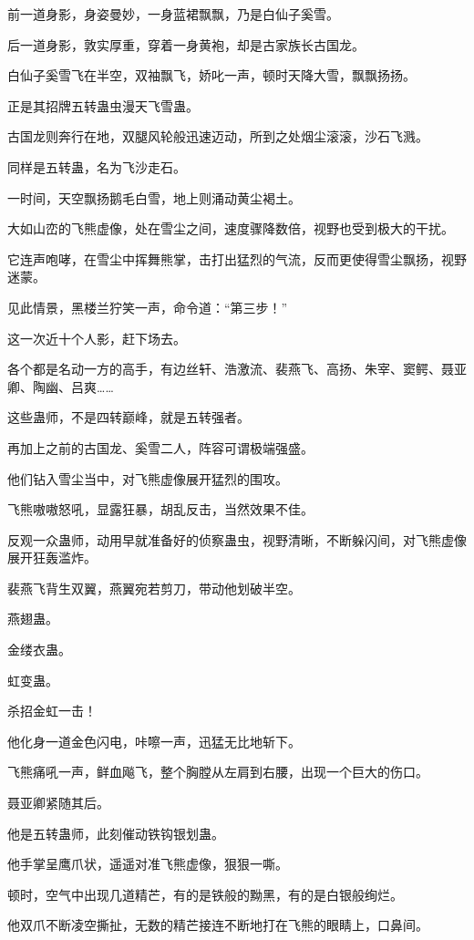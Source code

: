 \begin{this_body}
前一道身影，身姿曼妙，一身蓝裙飘飘，乃是白仙子奚雪。

后一道身影，敦实厚重，穿着一身黄袍，却是古家族长古国龙。

白仙子奚雪飞在半空，双袖飘飞，娇叱一声，顿时天降大雪，飘飘扬扬。

正是其招牌五转蛊虫漫天飞雪蛊。

古国龙则奔行在地，双腿风轮般迅速迈动，所到之处烟尘滚滚，沙石飞溅。

同样是五转蛊，名为飞沙走石。

一时间，天空飘扬鹅毛白雪，地上则涌动黄尘褐土。

大如山峦的飞熊虚像，处在雪尘之间，速度骤降数倍，视野也受到极大的干扰。

它连声咆哮，在雪尘中挥舞熊掌，击打出猛烈的气流，反而更使得雪尘飘扬，视野迷蒙。

见此情景，黑楼兰狞笑一声，命令道：“第三步！”

这一次近十个人影，赶下场去。

各个都是名动一方的高手，有边丝轩、浩激流、裴燕飞、高扬、朱宰、窦鳄、聂亚卿、陶幽、吕爽……

这些蛊师，不是四转巅峰，就是五转强者。

再加上之前的古国龙、奚雪二人，阵容可谓极端强盛。

他们钻入雪尘当中，对飞熊虚像展开猛烈的围攻。

飞熊嗷嗷怒吼，显露狂暴，胡乱反击，当然效果不佳。

反观一众蛊师，动用早就准备好的侦察蛊虫，视野清晰，不断躲闪间，对飞熊虚像展开狂轰滥炸。

裴燕飞背生双翼，燕翼宛若剪刀，带动他划破半空。

燕翅蛊。

金缕衣蛊。

虹变蛊。

杀招金虹一击！

他化身一道金色闪电，咔嚓一声，迅猛无比地斩下。

飞熊痛吼一声，鲜血飚飞，整个胸膛从左肩到右腰，出现一个巨大的伤口。

聂亚卿紧随其后。

他是五转蛊师，此刻催动铁钩银划蛊。

他手掌呈鹰爪状，遥遥对准飞熊虚像，狠狠一嘶。

顿时，空气中出现几道精芒，有的是铁般的黝黑，有的是白银般绚烂。

他双爪不断凌空撕扯，无数的精芒接连不断地打在飞熊的眼睛上，口鼻间。


\end{this_body}
